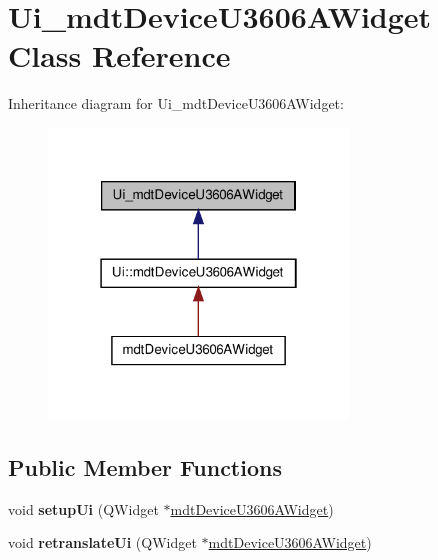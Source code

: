 \hypertarget{class_ui__mdt_device_u3606_a_widget}{
\section{Ui\_\-mdtDeviceU3606AWidget Class Reference}
\label{class_ui__mdt_device_u3606_a_widget}
}


Inheritance diagram for Ui\_\-mdtDeviceU3606AWidget:
\nopagebreak
\begin{figure}[H]
\begin{center}
\leavevmode
\includegraphics[width=226pt]{class_ui__mdt_device_u3606_a_widget__inherit__graph}
\end{center}
\end{figure}
\subsection*{Public Member Functions}
\begin{DoxyCompactItemize}
\item 
\hypertarget{class_ui__mdt_device_u3606_a_widget_a2feb0a9bb350eeb5b8f79aa1caf7812e}{
void {\bfseries setupUi} (QWidget $\ast$\hyperlink{classmdt_device_u3606_a_widget}{mdtDeviceU3606AWidget})}
\label{class_ui__mdt_device_u3606_a_widget_a2feb0a9bb350eeb5b8f79aa1caf7812e}

\item 
\hypertarget{class_ui__mdt_device_u3606_a_widget_a93edfa6bf95a90961fc73dce340f20d6}{
void {\bfseries retranslateUi} (QWidget $\ast$\hyperlink{classmdt_device_u3606_a_widget}{mdtDeviceU3606AWidget})}
\label{class_ui__mdt_device_u3606_a_widget_a93edfa6bf95a90961fc73dce340f20d6}

\end{DoxyCompactItemize}
